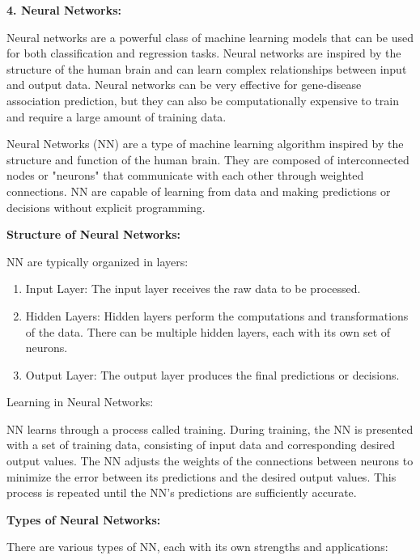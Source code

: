\textbf{4. Neural Networks:}

Neural networks are a powerful class of machine learning models that can be used for both classification and regression tasks. Neural networks are inspired by the structure of the human brain and can learn complex relationships between input and output data. Neural networks can be very effective for gene-disease association prediction, but they can also be computationally expensive to train and require a large amount of training data.

Neural Networks (NN) are a type of machine learning algorithm inspired by the structure and function of the human brain. They are composed of interconnected nodes or "neurons" that communicate with each other through weighted connections. NN are capable of learning from data and making predictions or decisions without explicit programming.

\textbf{Structure of Neural Networks:}

NN are typically organized in layers:

\begin{enumerate}
    \item Input Layer: The input layer receives the raw data to be processed.

    \item Hidden Layers: Hidden layers perform the computations and transformations of the data. There can be multiple hidden layers, each with its own set of neurons.

    \item Output Layer: The output layer produces the final predictions or decisions.

\end{enumerate}
Learning in Neural Networks:

NN learns through a process called training. During training, the NN is presented with a set of training data, consisting of input data and corresponding desired output values. The NN adjusts the weights of the connections between neurons to minimize the error between its predictions and the desired output values. This process is repeated until the NN's predictions are sufficiently accurate.

\textbf{Types of Neural Networks:}

There are various types of NN, each with its own strengths and applications:

